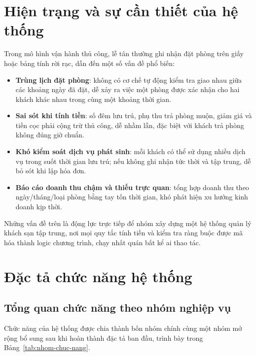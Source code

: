 \documentclass[14pt]{report}
\begin{document}
\section{Hiện trạng và sự cần thiết của hệ thống}

Trong mô hình vận hành thủ công, lễ tân thường ghi nhận đặt phòng trên giấy hoặc bảng tính rời rạc, dẫn đến một số vấn đề phổ biến:

\begin{itemize}
  \item \textbf{Trùng lịch đặt phòng}: không có cơ chế tự động kiểm tra giao nhau giữa các khoảng ngày đã đặt, dễ xảy ra việc một phòng được xác nhận cho hai khách khác nhau trong cùng một khoảng thời gian.
  \item \textbf{Sai sót khi tính tiền}: số đêm lưu trú, phụ thu trả phòng muộn, giảm giá và tiền cọc phải cộng trừ thủ công, dễ nhầm lẫn, đặc biệt với khách trả phòng không đúng giờ chuẩn.
  \item \textbf{Khó kiểm soát dịch vụ phát sinh}: mỗi khách có thể sử dụng nhiều dịch vụ trong suốt thời gian lưu trú; nếu không ghi nhận tức thời và tập trung, dễ bỏ sót khi lập hóa đơn.
  \item \textbf{Báo cáo doanh thu chậm và thiếu trực quan}: tổng hợp doanh thu theo ngày/tháng/loại phòng bằng tay tốn thời gian, khó phát hiện xu hướng kinh doanh kịp thời.
\end{itemize}

Những vấn đề trên là động lực trực tiếp để nhóm xây dựng một hệ thống quản lý khách sạn tập trung, nơi mọi quy tắc tính tiền và kiểm tra ràng buộc được mã hóa thành logic chương trình, chạy nhất quán bất kể ai thao tác.

\section{Đặc tả chức năng hệ thống}

\subsection{Tổng quan chức năng theo nhóm nghiệp vụ}

Chức năng của hệ thống được chia thành bốn nhóm chính cùng một nhóm mở rộng bổ sung sau khi hoàn thành đặc tả ban đầu, trình bày trong Bảng~\ref{tab:nhom-chuc-nang}.
\end{document}
